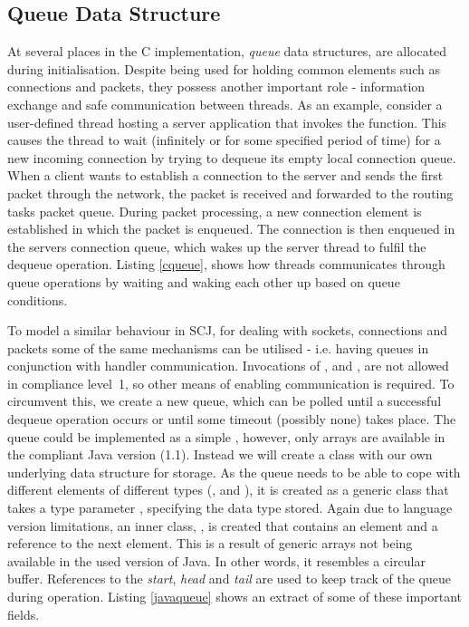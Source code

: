\subsection{Queue Data Structure} %
\label{sub:queue}
At several places in the C implementation, \textit{queue} data structures, are allocated during initialisation. Despite being used for holding common elements such as connections and packets, they possess another important role - information exchange and safe communication between threads. As an example, consider a user-defined thread hosting a server application that invokes the  function. This causes the thread to wait (infinitely or for some specified period of time) for a new incoming connection by trying to dequeue its empty local connection queue. When a client wants to establish a connection to the server and sends the first packet through the network, the packet is received and forwarded to the routing tasks packet queue. During packet processing, a new connection element is established in which the packet is enqueued. The connection is then enqueued in the servers connection queue, which wakes up the server thread to fulfil the dequeue operation. Listing \ref{cqueue}, shows how threads communicates through queue operations by waiting and waking each other up based on queue conditions. 



To model a similar behaviour in SCJ, for dealing with sockets, connections and packets some of the same mechanisms can be utilised - i.e. having queues in conjunction with handler communication. Invocations of ,  and , are not allowed in compliance level~1, so other means of enabling communication is required. To circumvent this, we create a new queue, which can be polled until a successful dequeue operation occurs or until some timeout (possibly none) takes place. The queue could be implemented as a simple , however, only arrays are available in the compliant Java version (1.1). Instead we will create a  class with our own underlying data structure for storage. As the queue needs to be able to cope with different elements of different types (,  and ), it is created as a generic class that takes a type parameter , specifying the data type stored. Again due to language version limitations, an inner class, , is created that contains an element and a reference to the next element. This is a result of generic arrays not being available in the used version of Java. In other words, it resembles a circular buffer. References to the \textit{start}, \textit{head} and \textit{tail} are used to keep track of the queue during operation. Listing \ref{javaqueue} shows an extract of some of these important fields.

